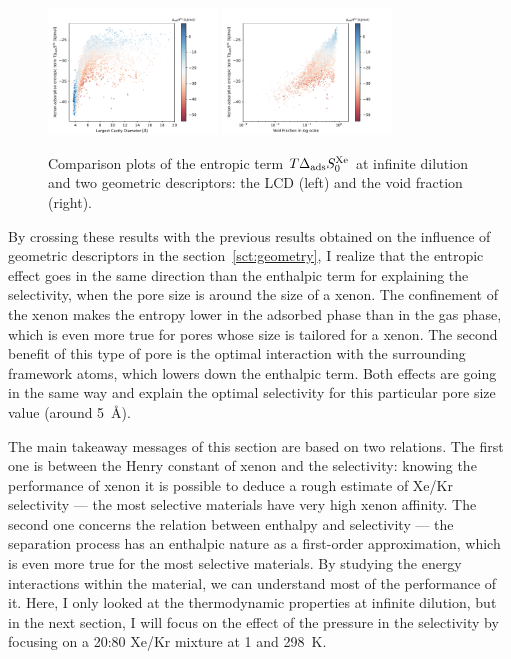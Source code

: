 \documentclass[main.tex]{subfiles}
\begin{document}
\begin{figure}
  \centering
  \includegraphics[width=0.4\textwidth]{figures/2-thermo/Scatterplot_entropy_lcd.pdf}
  \includegraphics[width=0.4\textwidth]{figures/2-thermo/Scatterplot_entropy_vf.pdf}
  \caption{Comparison plots of the entropic term $T\Delta_{\text{ads}}S^{\text{Xe}}_{\text{0}}$ at infinite dilution and two geometric descriptors: the LCD (left) and the void fraction (right).}\label{fgr:entropy_geometry}
\end{figure}

By crossing these results with the previous results obtained on the influence of geometric descriptors in the section~\ref{sct:geometry}, I realize that the entropic effect goes in the same direction than the enthalpic term for explaining the selectivity, when the pore size is around the size of a xenon. The confinement of the xenon makes the entropy lower in the adsorbed phase than in the gas phase, which is even more true for pores whose size is tailored for a xenon. The second benefit of this type of pore is the optimal interaction with the surrounding framework atoms, which lowers down the enthalpic term. Both effects are going in the same way and explain the optimal selectivity for this particular pore size value (around \SI{5}{\angstrom}). 

The main takeaway messages of this section are based on two relations. The first one is between the Henry constant of xenon and the selectivity: knowing the performance of xenon it is possible to deduce a rough estimate of Xe/Kr selectivity --- the most selective materials have very high xenon affinity. The second one concerns the relation between enthalpy and selectivity --- the separation process has an enthalpic nature as a first-order approximation, which is even more true for the most selective materials. By studying the energy interactions within the material, we can understand most of the performance of it. Here, I only looked at the thermodynamic properties at infinite dilution, but in the next section, I will focus on the effect of the pressure in the selectivity by focusing on a 20:80 Xe/Kr mixture at \SI{1}{\atm} and \SI{298}{\kelvin}. 
\end{document}
